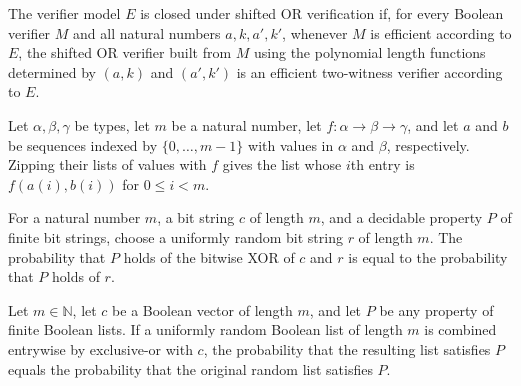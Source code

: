 \begin{definition}
\label{Randomized.ClosedUnderShiftOr}
\leanok
{}
The verifier model $E$ is closed under shifted OR verification if, for every Boolean
verifier $M$ and all natural numbers $a,k,a',k'$, whenever $M$ is efficient according to
$E$, the shifted OR verifier built from $M$ using the polynomial length functions
determined by $(a,k)$ and $(a',k')$ is an efficient two-witness verifier according to
$E$.
\end{definition}

\begin{theorem}
\label{Randomized.zipWith_ofFn}
\leanok
{}
Let $\alpha,\beta,\gamma$ be types, let $m$ be a natural number, let
$f:\alpha\to\beta\to\gamma$, and let $a$ and $b$ be sequences indexed by
$\{0,\ldots,m-1\}$ with values in $\alpha$ and $\beta$, respectively. Zipping their
lists of values with $f$ gives the list whose $i$th entry is $f(a(i),b(i))$ for $0\le
i<m$.
\end{theorem}

\begin{theorem}
\label{Randomized.randProb_xor_right}
\leanok
{}
For a natural number $m$, a bit string $c$ of length $m$, and a decidable property $P$
of finite bit strings, choose a uniformly random bit string $r$ of length $m$. The
probability that $P$ holds of the bitwise XOR of $c$ and $r$ is equal to the probability
that $P$ holds of $r$.
\end{theorem}

\begin{theorem}
\label{Randomized.randProb_xor_left}
\leanok
{}
Let $m\in\mathbb{N}$, let $c$ be a Boolean vector of length $m$, and let $P$ be any
property of finite Boolean lists. If a uniformly random Boolean list of length $m$ is
combined entrywise by exclusive-or with $c$, the probability that the resulting list
satisfies $P$ equals the probability that the original random list satisfies $P$.
\end{theorem}


